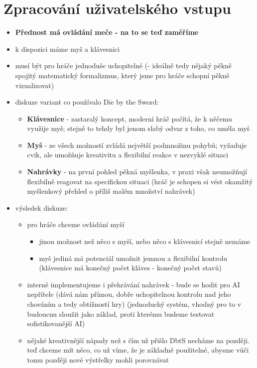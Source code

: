 \section{Zpracování uživatelského vstupu}
\begin{itemize}
    \item \textbf{Přednost má ovládání meče - na to se teď zaměříme}
    \item k dispozici máme myš a klávesnici
    \item musí být pro hráče jednoduše uchopitelné (- ideálně tedy nějaký pěkně spojitý matematický formalizmus, který jsme pro hráče schopní pěkně vizualizovat)
    \item diskuze variant co používalo Die by the Sword:
        \begin{itemize}
            \item \textbf{Klávesnice} - zastaralý koncept, moderní hráč počítá, že k něčemu využije myš; stejně to tehdy byl jenom slabý odvar z toho, co uměla myš
            \item \textbf{Myš} - ze všech možností zvládá největší podmnožinu pohybů; vyžaduje cvik, ale umožňuje kreativitu a flexibilní reakce v nezvyklé situaci
            \item \textbf{Nahrávky} - na první pohled pěkná myšlenka, v praxi však neumožňují flexibilně reagovat na specifickou situaci (hráč je schopen si vést okamžitý myšlenkový přehled o příliš malém množství nahrávek)
        \end{itemize}
    \item výsledek diskuze:
        \begin{itemize}
            \item pro hráče chceme ovládání myší
            \begin{itemize}
                \item jinou možnost než něco s myší, nebo něco s klávesnicí stejně nemáme
                \item myš jediná má potenciál umožnit jemnou a flexibilní kontrolu (klávesnice má konečný počet kláves - konečný počet stavů)
            \end{itemize}
            \item interně implementujeme i přehrávání nahrávek - bude se hodit pro AI nepřítele (dává nám přímou, dobře uchopitelnou kontrolu nad jeho chováním a tedy obtížností hry) (jednoduchý systém, vhodný pro to v budoucnu sloužit jako základ, proti kterému budeme testovat sofistikovanější AI)
            \item nějaké kreativnější nápady než s čím už přišlo DbtS necháme na později. teď chceme mít něco, co už víme, že je základně použitelné, abysme vůči tomu později nové výstřelky mohli porovnávat

\end{itemize}
\end{itemize}
